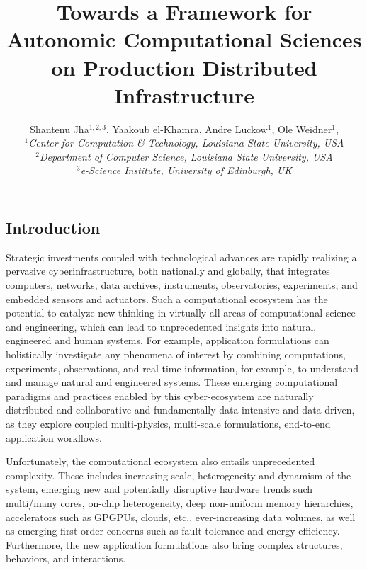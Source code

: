 \documentclass[a4paper,10pt]{article}
\begin{document}
 \title{ \large \vspace{-3.5em} Towards a Framework for Autonomic
   Computational Sciences on Production Distributed Infrastructure}

 \author{\normalsize Shantenu Jha$^{1,2,3}$, Yaakoub el-Khamra, Andre Luckow$^{1}$, Ole Weidner$^{1}$, \\
   \small{\emph{$^{1}$Center for Computation \& Technology, Louisiana State University, USA}}\\
   \small{\emph{$^{2}$Department of Computer Science, Louisiana State University, USA}}\\
   \small{\emph{$^{3}$e-Science Institute, University of Edinburgh,
       UK}} } \date{}
 \maketitle
 
\subsection*{Introduction}
\vspace{-0.6em}

Strategic investments coupled with technological advances are rapidly
realizing a pervasive cyberinfrastructure, both nationally and
globally, that integrates computers, networks, data archives,
instruments, observatories, experiments, and embedded sensors and
actuators. Such a computational ecosystem has the potential to
catalyze new thinking in virtually all areas of computational science
and engineering, which can lead to unprecedented insights into
natural, engineered and human systems. For example, application
formulations can holistically investigate any phenomena of interest by
combining computations, experiments, observations, and real-time
information, for example, to understand and manage natural and
engineered systems. These emerging computational paradigms and
practices enabled by this cyber-ecosystem are naturally distributed
and collaborative and fundamentally data intensive and data driven, as
they explore coupled multi-physics, multi-scale formulations,
end-to-end application workflows.

Unfortunately, the computational ecosystem also entails unprecedented
complexity. These includes increasing scale, heterogeneity and
dynamism of the system, emerging new and potentially disruptive
hardware trends such multi/many cores, on-chip heterogeneity, deep
non-uniform memory hierarchies, accelerators such as GPGPUs, clouds,
etc., ever-increasing data volumes, as well as emerging first-order
concerns such as fault-tolerance and energy efficiency. Furthermore,
the new application formulations also bring complex structures,
behaviors, and interactions.
\end{document}

